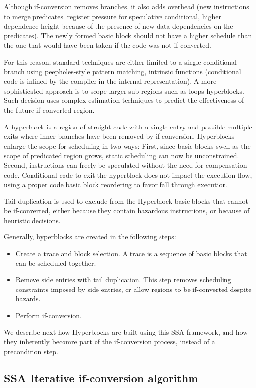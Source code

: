 Although if-conversion removes branches, it also adds overhead (new instructions to merge predicates, register pressure for speculative conditional, higher dependence height because of the presence of new data dependencies on the predicates). The newly formed basic block should not have a higher schedule than the one that would have been taken if the code was not if-converted.

For this reason, standard techniques are either limited to a single conditional branch using peepholes-style pattern matching, intrinsic functions (conditional code is inlined by the compiler in the internal representation). A more sophisticated approach is to scope larger sub-regions such as loops hyperblocks. Such decision uses complex estimation techniques to predict the effectiveness of the future if-converted region.

A hyperblock is a region of straight code with a single entry and possible multiple exits where inner branches have been removed by if-conversion.
Hyperblocks enlarge the scope for scheduling in two ways: First, since basic blocks swell as the scope of predicated region grows, static scheduling can now be unconstrained. Second, instructions can freely be speculated without the need for compensation code. Conditional code to exit the hyperblock does not impact the execution flow, using a proper code basic block reordering to favor fall through execution.

Tail duplication is used to exclude from the Hyperblock basic blocks that cannot be if-converted, either because they contain hazardous instructions, or because of heuristic decisions.

Generally, hyperblocks are created in the following steps:
\begin{itemize}
\item Create a trace and block selection. A trace is a sequence of basic blocks that can be scheduled together. 
\item Remove side entries with tail duplication. This step removes scheduling constraints imposed by side entries, or allow regions to be if-converted despite hazards.
\item Perform if-conversion.
\end{itemize}

We describe next how Hyperblocks are built using this SSA framework, and how they inherently becomre part of the if-conversion process, instead of a precondition step.

\subsection{SSA Iterative if-conversion algorithm}

